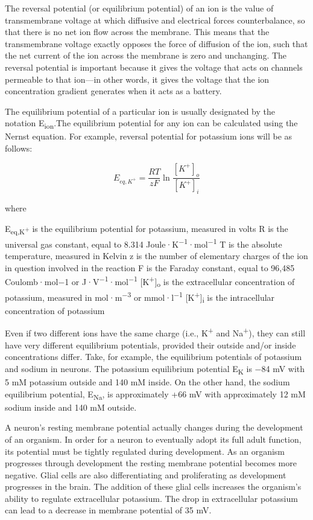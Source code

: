 \documentclass[]{book}
\begin{document}
The reversal potential (or equilibrium potential) of an ion is the value of transmembrane voltage at which diffusive and electrical forces counterbalance, so that there is no net ion flow across the membrane. This means that the transmembrane voltage exactly opposes the force of diffusion of the ion, such that the net current of the ion across the membrane is zero and unchanging. The reversal potential is important because it gives the voltage that acts on channels permeable to that ion---in other words, it gives the voltage that the ion concentration gradient generates when it acts as a battery.

The equilibrium potential of a particular ion is usually designated by the notation E\textsubscript{ion}.The equilibrium potential for any ion can be calculated using the Nernst equation. For example, reversal potential for potassium ions will be as follows:

\[  E_{eq,K^+} = \frac{RT}{zF} \ln \frac{[K^+]_{o}}{[K^+]_{i}} \]

where

E\textsubscript{eq,K\textsuperscript{+}} is the equilibrium potential for potassium, measured in volts
R is the universal gas constant, equal to 8.314 Joule·K\textsuperscript{−1}·mol\textsuperscript{−1}
T is the absolute temperature, measured in Kelvin
z is the number of elementary charges of the ion in question involved in the reaction
F is the Faraday constant, equal to 96,485 Coulomb·mol−1 or J·V\textsuperscript{−1}·mol\textsuperscript{−1}
{[}K\textsuperscript{+}{]}\textsubscript{o} is the extracellular concentration of potassium, measured in mol·m\textsuperscript{−3} or mmol·l\textsuperscript{−1}
{[}K\textsuperscript{+}{]}\textsubscript{i} is the intracellular concentration of potassium

Even if two different ions have the same charge (i.e., K\textsuperscript{+} and Na\textsuperscript{+}), they can still have very different equilibrium potentials, provided their outside and/or inside concentrations differ. Take, for example, the equilibrium potentials of potassium and sodium in neurons. The potassium equilibrium potential E\textsubscript{K} is −84 mV with 5 mM potassium outside and 140 mM inside. On the other hand, the sodium equilibrium potential, E\textsubscript{Na}, is approximately +66 mV with approximately 12 mM sodium inside and 140 mM outside.

A neuron's resting membrane potential actually changes during the development of an organism. In order for a neuron to eventually adopt its full adult function, its potential must be tightly regulated during development. As an organism progresses through development the resting membrane potential becomes more negative. Glial cells are also differentiating and proliferating as development progresses in the brain. The addition of these glial cells increases the organism's ability to regulate extracellular potassium. The drop in extracellular potassium can lead to a decrease in membrane potential of 35 mV.
\end{document}
